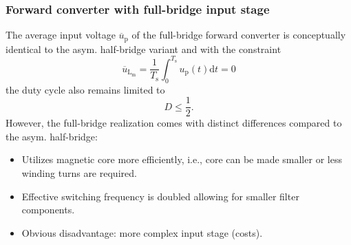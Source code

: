 \begin{frame}
    \frametitle{Forward converter with full-bridge input stage}
    The average input voltage $\overline{u}_\mathrm{p}$ of the full-bridge forward converter is conceptually identical to the asym. half-bridge variant and with the constraint
    \begin{equation*}
        \overline{u}_\mathrm{L_\mathrm{m}} = \frac{1}{T_\mathrm{s}}\int_{0}^{T_\mathrm{s}}u_\mathrm{p}(t)\mathrm{d}t = 0
    \end{equation*}
    the duty cycle also remains limited to
    $$
    D\leq\frac{1}{2} .
    $$
    However, the full-bridge realization comes with distinct differences compared to the asym. half-bridge:
    \begin{itemize}
        \item Utilizes magnetic core more efficiently, i.e., core can be made smaller or less winding turns are required.
        \item Effective switching frequency is doubled allowing for smaller filter components.
        \item Obvious disadvantage: more complex input stage (costs).
    \end{itemize}
\end{frame}

